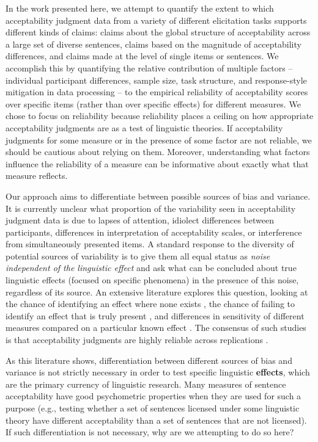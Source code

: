 \documentclass[doc]{apa6}
\begin{document}
In the work presented here, we attempt to quantify the extent to which acceptability judgment data from a variety of different elicitation tasks supports different kinds of claims: claims about the global structure of acceptability across a large set of diverse sentences, claims based on the magnitude of acceptability differences, and claims made at the level of single items or sentences. We accomplish this by quantifying the relative contribution of multiple factors -- individual participant differences, sample size, task structure, and response-style mitigation in data processing -- to the empirical reliability of acceptability scores over specific items (rather than over specific effects) for different measures. We chose to focus on reliability because reliability places a ceiling on how appropriate acceptability judgments are as a test of linguistic theories. If acceptability judgments for some measure or in the presence of some factor are not reliable, we should be cautious about relying on them. Moreover, understanding what factors influence the reliability of a measure can be informative about exactly what that measure reflects.


Our approach aims to differentiate between  possible sources of bias and variance.
It is currently unclear what proportion of the variability seen in acceptability judgment data is due to lapses of attention, idiolect differences between participants, differences in interpretation of acceptability scales, or interference from simultaneously presented items.
A standard response to the diversity of potential sources of variability is to give them all equal status as \textit{noise independent of the linguistic effect} and ask what can be concluded about true linguistic effects (focused on specific phenomena) in the presence of this noise, regardless of its source. An extensive literature explores this question, looking at the chance of identifying an effect where none exists \citep{sprouse2011poweracceptabilityjudgment,sprouse2013formalinformal}, the chance of failing to identify an effect that is truly present \citep{sprousealmeida2017sensitivitypower}, and differences in sensitivity of different measures compared on a particular known effect \citep{weskott2011informativity}. The  consensus of such studies is that acceptability judgments are highly reliable across replications \citep{sprouseINPRESSsettingtherecordstraight}.

As this literature shows, differentiation between different sources of bias and variance is not strictly necessary in order to test specific linguistic {\bf effects}, which are the primary currency of linguistic research. Many measures of sentence acceptability have good psychometric properties when they are used for such a purpose (e.g., testing whether a set of sentences licensed under some linguistic theory have different acceptability than a set of sentences that are not licensed). If such differentiation is not necessary, why are we attempting to do so here?
\end{document}
